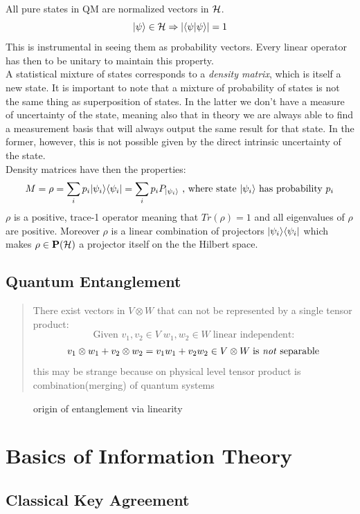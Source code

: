 	All pure states in QM are normalized vectors in $\mathcal{H}$.
	$$ |\psi \rangle\in\mathcal{H} \Rightarrow  \vert\langle\psi|\psi\rangle\vert = 1$$
	This is instrumental in seeing them as probability vectors. Every linear operator has then to be unitary to maintain this property.\\
	A statistical mixture of states corresponds to a \emph{density matrix}, which is itself a new state. It is important to note that a mixture of probability of states is not the same thing as superposition of states. In the latter we don't have a measure of uncertainty of the state, meaning also that in theory we are always able to find a measurement basis that will always output the same result for that state. In the former, however, this is not possible given by the direct intrinsic uncertainty of the state.\\
	Density matrices have then the properties:
	$$ M = \rho = \sum_i p_i |\psi_i \rangle\langle \psi_i| = \sum_i p_i P_{|\psi_i \rangle} \text{  , where state }|\psi_i \rangle\text{ has probability } p_i $$ 
	$\rho$ is a positive, trace-1 operator meaning that $Tr(\rho) = 1$ and all eigenvalues of $\rho$ are positive. Moreover $\rho$ is a linear combination of projectors $|\psi_i\rangle\langle \psi_i|$ which makes $\rho\in\mathbf{P}(\mathcal{H})$ a projector itself on the the Hilbert space.
	

	
		\subsection{Quantum Entanglement}
		\begin{quotation}
		There exist vectors in $V\otimes W$ that can not be represented by a single tensor product:
		$$ \textrm{Given } v_1,v_2\in V \; w_1,w_2\in W \; \textrm{linear independent:}$$
		$$v_1\otimes w_1 + v_2\otimes w_2 = v_1w_1 + v_2w_2 \in V\otimes W \; \textrm{is \emph{not} separable}$$ 
		this may be strange because on physical level tensor product is combination(merging) of quantum systems
		\cite{Han13}
		\end{quotation}
		
		\begin{figure}[h]
			\centering
			
			\caption{origin of entanglement via linearity}
		\end{figure}
		
	\section{Basics of Information Theory}
	\lipsum[3]
		\subsection{Classical Key Agreement}
		\lipsum[3]